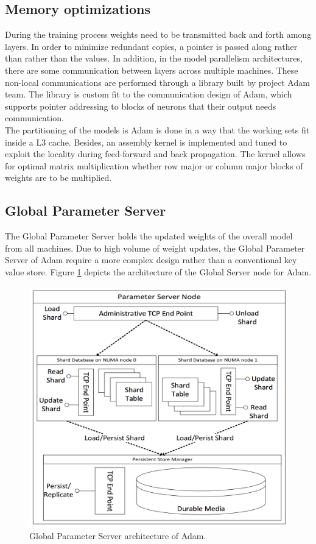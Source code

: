 \documentclass[runningheads,a4paper]{llncs}
\begin{document}
\subsection*{Memory optimizations}

During the training process weights need to be transmitted back and forth among layers. In order to minimize redundant copies, a pointer is passed along rather than rather than the values. In addition, in the model parallelism architectures, there are some communication between layers across multiple machines. These non-local communications are performed through a library built by project Adam team. The library is custom fit to the communication design of Adam, which supports pointer addressing to blocks of neurons that their output needs communication.\\

The partitioning of the models is Adam is done in a way that the working sets fit inside a L3 cache. Besides, an assembly kernel is implemented and tuned to exploit the locality during feed-forward and back propagation. The kernel allows for optimal matrix multiplication whether row major or column major blocks of weights are to be multiplied.\\

\subsection*{Global Parameter Server}

The Global Parameter Server holds the updated weights of the overall model from all machines. Due to high volume of weight updates, the Global Parameter Server of Adam require a more complex design rather than a conventional key value store. Figure \ref{fig:adam_global_param} depicts the architecture of the Global Server node for Adam.
\begin{figure}[h]
	\includegraphics[scale=0.42]{./images/adam_global_param_server.png}
	\centering
	\caption{Global Parameter Server architecture of Adam\cite{chilimbi2014project}.}
	\label{fig:adam_global_param}
\end{figure}
\end{document}
